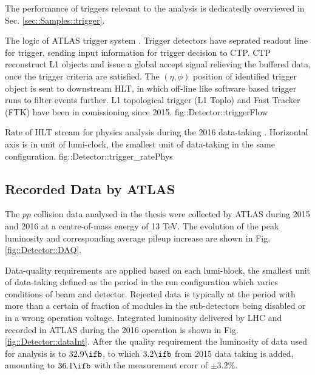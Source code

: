 The performance of triggers relevant to the analysis is dedicatedly overviewed in Sec. \ref{sec::Samples::trigger}.


%
{The logic of ATLAS trigger system \cite{trigger2015}. Trigger detectors have seprated readout line for trigger, sending input information for trigger decision to CTP. 
CTP reconstruct L1 objects and issue a global accept signal relieving the buffered data, once the trigger criteria are satisfied. 
The $(\eta,\phi)$ position of identified trigger object is sent to downstream HLT, in which off-line like software based trigger runs to filter events further.
L1 topological trigger (L1 Toplo) and Fast Tracker (FTK) have been in comissioning since 2015. 
}
{fig::Detector::triggerFlow}

{Rate of HLT stream for physics analysis during the 2016 data-taking \cite{trigPubResult}. Horizontal axis is in unit of lumi-clock, the smallest unit of data-taking in the same configuration.}
{fig::Detector::trigger_ratePhys}



\subsection{Recorded Data by ATLAS}
The $pp$ collision data analysed in the thesis were collected by ATLAS during 2015 and 2016 at a centre-of-mass energy of 13 TeV. 
The evolution of the peak luminosity and  corresponding average pileup increase are shown in Fig. \ref{fig::Detector::DAQ}.

Data-quality requirements are applied based on each lumi-block, the smallest unit of data-taking defined as the period in the run configuration which varies conditions of beam and detector. 
Rejected data is typically at the period with more than a certain of fraction of modules in the sub-detectors being disabled or in a wrong operation voltage.
Integrated luminosity delivered by LHC and recorded in ATLAS during the 2016 operation is shown in Fig. \ref{fig::Detector::dataInt}. After the quality requirement the luminosity of data used for analysis is to $32.9\ifb$, to which $3.2\ifb$ from 2015 data taking is added, amounting to $36.1\ifb$ with the measurement erorr of $\pm3.2\%$. \\

